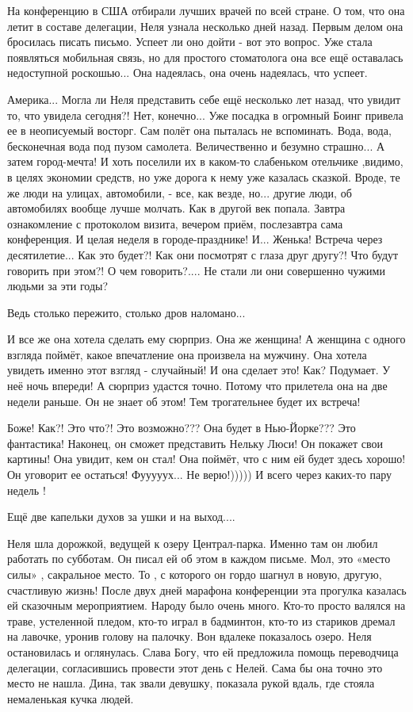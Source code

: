 На конференцию в США отбирали лучших врачей по всей стране. О том, что она летит
в составе делегации, Неля узнала несколько дней назад. Первым делом она бросилась
писать письмо. Успеет ли оно дойти - вот это вопрос. Уже стала появляться
мобильная связь, но для простого стоматолога она все ещё оставалась недоступной
роскошью... Она надеялась, она очень надеялась, что успеет.

Америка... Могла ли Неля представить себе ещё несколько лет назад, что увидит
то, что увидела сегодня?! Нет, конечно... Уже посадка в огромный Боинг привела
ее в неописуемый восторг. Сам полёт она пыталась не вспоминать. Вода, вода,
бесконечная вода под пузом самолета. Величественно и безумно страшно... А затем
город-мечта! И хоть поселили их в каком-то слабеньком отельчике ,видимо, в
целях экономии средств, но уже дорога к нему уже казалась сказкой. Вроде, те же
люди на улицах, автомобили, - все, как везде, но... другие люди, об автомобилях
вообще лучше молчать. Как в другой век попала. Завтра ознакомление с протоколом
визита, вечером приём, послезавтра сама конференция. И целая неделя в
городе-празднике! И... Женька! Встреча через десятилетие... Как это будет?! Как
они посмотрят с глаза друг другу?! Что будут говорить при этом?! О чем
говорить?.... Не стали ли они совершенно чужими людьми за эти годы?

Ведь столько пережито, столько дров наломано...

И все же она хотела сделать ему сюрприз. Она же женщина! А женщина с одного
взгляда поймёт, какое впечатление она произвела на мужчину. Она хотела увидеть
именно этот взгляд - случайный! И она сделает это! Как? Подумает. У неё ночь
впереди! А сюрприз удастся точно. Потому что прилетела она на две недели
раньше. Он не знает об этом! Тем трогательнее будет их встреча! 

Боже! Как?! Это что?! Это возможно??? Она будет в Нью-Йорке??? Это фантастика!
Наконец, он сможет представить Нельку Люси! Он покажет свои картины! Она
увидит, кем он стал! Она поймёт, что с ним ей будет здесь хорошо! Он уговорит ее
остаться! Фууууух... Не верю!))))) И всего через каких-то пару недель ! 

Ещё две капельки духов за ушки и на выход....

Неля шла дорожкой, ведущей к озеру Централ-парка. Именно там он любил работать по
субботам. Он писал ей об этом в каждом письме. Мол, это «место силы» , сакральное
место. То , с которого он гордо шагнул в новую, другую, счастливую жизнь! После
двух дней марафона конференции эта прогулка казалась ей сказочным
мероприятием. Народу было очень много. Кто-то просто валялся на траве, устеленной
пледом, кто-то играл в бадминтон, кто-то из стариков дремал на лавочке, уронив
голову на палочку. Вон вдалеке показалось озеро. Неля остановилась и
оглянулась. Слава Богу, что ей предложила помощь переводчица
делегации, согласившись провести этот день с Нелей. Сама бы она точно это место
не нашла. Дина, так звали девушку, показала рукой вдаль, где стояла немаленькая
кучка людей.

